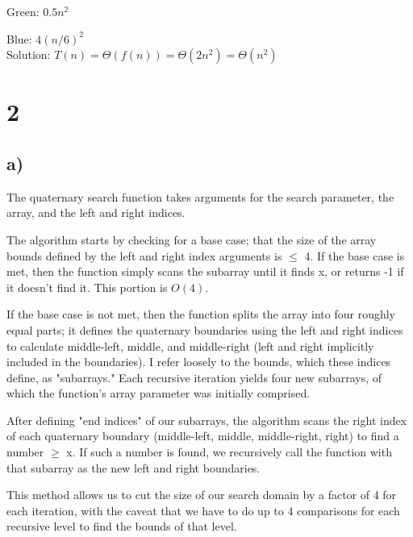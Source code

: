 \documentclass[10pt,a4paper]{report}
\begin{document}
	Green: $0.5n^2$
	
	Blue: $4(n/6)^2$
	\\
	
	Solution: $T(n) = \Theta(f(n)) = \Theta(2n^2) = \Theta(n^2)$
	
	\newpage
	\section*{2}
	\subsection*{a)}
	The quaternary search function takes arguments for the search parameter, the array, and the left and right indices.
	
	The algorithm starts by checking for a base case; that the size of the array bounds defined by the left and right index arguments is $\le$ 4. If the base case is met, then the function simply scans the subarray until it finds x, or returns -1 if it doesn't find it. This portion is $O(4)$.
	
	If the base case is not met, then the function splits the array into four roughly equal parts; it defines the quaternary boundaries using the left and right indices to calculate middle-left, middle, and middle-right (left and right implicitly included in the boundaries). I refer loosely to the bounds, which these indices define, as "subarrays." Each recursive iteration yields four new subarrays, of which the function's array parameter was initially comprised.
	
	After defining "end indices" of our subarrays, the algorithm scans the right index of each quaternary boundary (middle-left, middle, middle-right, right) to find a number $\ge$ x. If such a number is found, we recursively call the function with that subarray as the new left and right boundaries.
	
	This method allows us to cut the size of our search domain by a factor of 4 for each iteration, with the caveat that we have to do up to 4 comparisons for each recursive level to find the bounds of that level.
	\\
	
\end{document}
